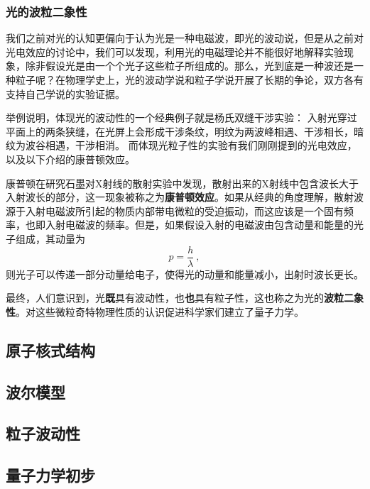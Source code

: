 \subsubsection{光的波粒二象性}
我们之前对光的认知更偏向于认为光是一种电磁波，即光的波动说，但是从之前对光电效应的讨论中，我们可以发现，利用光的电磁理论并不能很好地解释实验现象，除非假设光是由一个个光子这些粒子所组成的。那么，光到底是一种波还是一种粒子呢？在物理学史上，光的波动学说和粒子学说开展了长期的争论，双方各有支持自己学说的实验证据。

举例说明，体现光的波动性的一个经典例子就是杨氏双缝干涉实验：
入射光穿过平面上的两条狭缝，在光屏上会形成干涉条纹，明纹为两波峰相遇、干涉相长，暗纹为波谷相遇，干涉相消。
而体现光粒子性的实验有我们刚刚提到的光电效应，以及以下介绍的康普顿效应。

康普顿在研究石墨对X射线的散射实验中发现，散射出来的X射线中包含波长大于入射波长的部分，这一现象被称之为\textbf{康普顿效应}。如果从经典的角度理解，散射波源于入射电磁波所引起的物质内部带电微粒的受迫振动，而这应该是一个固有频率，也即入射电磁波的频率。但是，如果假设入射的电磁波由包含动量和能量的光子组成，其动量为$$p=\dfrac{h}{\lambda}~,$$则光子可以传递一部分动量给电子，使得光的动量和能量减小，出射时波长更长。

最终，人们意识到，光\textbf{既}具有波动性，也\textbf{也}具有粒子性，这也称之为光的\textbf{波粒二象性}。对这些微粒奇特物理性质的认识促进科学家们建立了量子力学。

\subsection{原子核式结构}

\subsection{波尔模型}
\subsection{粒子波动性}
\subsection{量子力学初步}

% 
% 